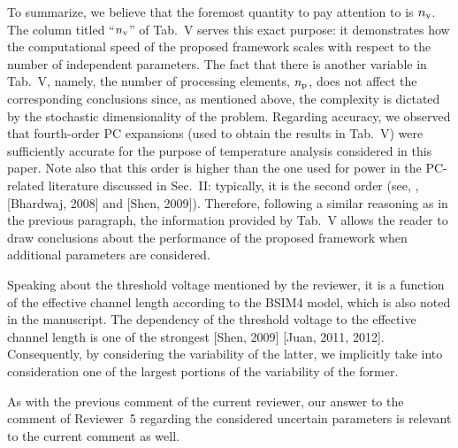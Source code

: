 \begin{authors}
To summarize, we believe that the foremost quantity to pay attention to is ${n_\text{v}}$.
The column titled ``${n_\text{v}}$'' of Tab.~V serves this exact purpose: it demonstrates how the computational speed of the proposed framework scales with respect to the number of independent parameters.
The fact that there is another variable in Tab.~V, namely, the number of processing elements, ${n_\text{p}}$, does not affect the corresponding conclusions since, as mentioned above, the complexity is dictated by the stochastic dimensionality of the problem.
Regarding accuracy, we observed that fourth-order PC expansions (used to obtain the results in Tab.~V) were sufficiently accurate for the purpose of temperature analysis considered in this paper.
Note also that this order is higher than the one used for power in the PC-related literature discussed in Sec.~II: typically, it is the second order (see, \eg, [Bhardwaj, 2008] and [Shen, 2009]).
Therefore, following a similar reasoning as in the previous paragraph, the information provided by Tab.~V allows the reader to draw conclusions about the performance of the proposed framework when additional parameters are considered.

Speaking about the threshold voltage mentioned by the reviewer, it is a function of the effective channel length according to the BSIM4 model, which is also noted in the manuscript.
The dependency of the threshold voltage to the effective channel length is one of the strongest [Shen, 2009] [Juan, 2011, 2012].
Consequently, by considering the variability of the latter, we implicitly take into consideration one of the largest portions of the variability of the former.

As with the previous comment of the current reviewer, our answer to the comment of Reviewer~5 regarding the considered uncertain parameters is relevant to the current comment as well.

\end{authors}
